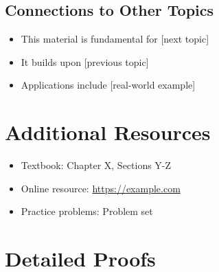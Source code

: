 \documentclass[11pt,a4paper]{article}
\begin{document}
\subsection{Connections to Other Topics}
\begin{itemize}
    \item This material is fundamental for [next topic]
    \item It builds upon [previous topic]
    \item Applications include [real-world example]
\end{itemize}

\appendix
\section{Additional Resources}
\begin{itemize}
    \item Textbook: Chapter X, Sections Y-Z
    \item Online resource: \url{https://example.com}
    \item Practice problems: Problem set 
\end{itemize}

\section{Detailed Proofs}
\end{document}
